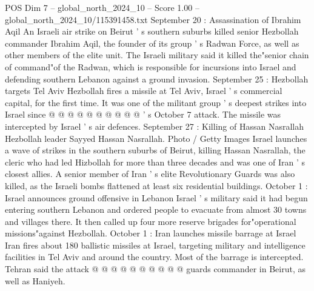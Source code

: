 \begin{textsample}{POS Dim 7 – global\_north\_2024\_10 – Score 1.00 – global\_north\_2024\_10/115391458.txt}
September 20 : Assassination of Ibrahim Aqil An Israeli air strike on Beirut ' s southern suburbs killed senior Hezbollah commander Ibrahim Aqil, the founder of its group ' s Radwan Force, as well as other members of the elite unit.
The Israeli military said it killed the"senior chain of command"of the Radwan, which is responsible for incursions into Israel and defending southern Lebanon against a ground invasion.
September 25 : Hezbollah targets Tel Aviv Hezbollah fires a missile at Tel Aviv, Israel ' s commercial capital, for the first time.
It was one of the militant group ' s deepest strikes into Israel since @ @ @ @ @ @ @ @ @ @ ' s October 7 attack.
The missile was intercepted by Israel ' s air defences.
September 27 : Killing of Hassan Nasrallah Hezbollah leader Sayyed Hassan Nasrallah.
Photo / Getty Images Israel launches a wave of strikes in the southern suburbs of Beirut, killing Hassan Nasrallah, the cleric who had led Hizbollah for more than three decades and was one of Iran ' s closest allies.
A senior member of Iran ' s elite Revolutionary Guards was also killed, as the Israeli bombs flattened at least six residential buildings.
October 1 : Israel announces ground offensive in Lebanon Israel ' s military said it had begun entering southern Lebanon and ordered people to evacuate from almost 30 towns and villages there.
It then called up four more reserve brigades for"operational missions"against Hezbollah.
October 1 : Iran launches missile barrage at Israel Iran fires about 180 ballistic missiles at Israel, targeting military and intelligence facilities in Tel Aviv and around the country.
Most of the barrage is intercepted.
Tehran said the attack @ @ @ @ @ @ @ @ @ @ guards commander in Beirut, as well as Haniyeh.

\end{textsample}
